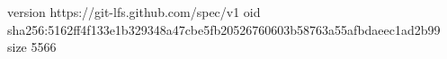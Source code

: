 version https://git-lfs.github.com/spec/v1
oid sha256:5162ff4f133e1b329348a47cbe5fb20526760603b58763a55afbdaeec1ad2b99
size 5566
